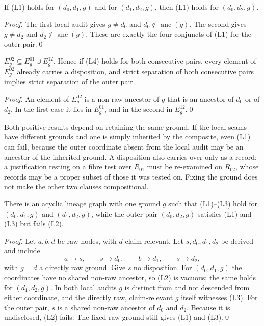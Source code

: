 \documentclass[smallextended,envcountsect,envcountsame,natbib]{svjour3}
\begin{document}
\begin{proposition}\label{ex:prop:l1-compose}
If (L1) holds for $(d_0,d_1,g)$ and for $(d_1,d_2,g)$, then (L1) holds for $(d_0,d_2,g)$.
\end{proposition}
\begin{proof}
The first local audit gives $g\neq d_0$ and $d_0\notin\operatorname{anc}(g)$. The second gives $g\neq d_2$ and $d_2\notin\operatorname{anc}(g)$. These are exactly the four conjuncts of (L1) for the outer pair.\qed
\end{proof}

\begin{proposition}\label{ex:prop:l4-compose}
$E^{02}_g\subseteq E^{01}_g\cup E^{12}_g$. Hence if (L4) holds for both consecutive pairs, every element of $E^{02}_g$ already carries a disposition, and strict separation of both consecutive pairs implies strict separation of the outer pair.
\end{proposition}
\begin{proof}
An element of $E^{02}_g$ is a non-raw ancestor of $g$ that is an ancestor of $d_0$ or of $d_2$. In the first case it lies in $E^{01}_g$, and in the second in $E^{12}_g$.\qed
\end{proof}

Both positive results depend on retaining the same ground. If the local seams have different grounds and one is simply inherited by the composite, even (L1) can fail, because the outer coordinate absent from the local audit may be an ancestor of the inherited ground. A disposition also carries over only as a record: a justification resting on a fibre test over $R_{01}$ must be re-examined on $R_{02}$, whose records may be a proper subset of those it was tested on. Fixing the ground does not make the other two clauses compositional.

\begin{proposition}\label{ex:prop:l2-noncompose}
There is an acyclic lineage graph with one ground $g$ such that (L1)--(L3) hold for $(d_0,d_1,g)$ and $(d_1,d_2,g)$, while the outer pair $(d_0,d_2,g)$ satisfies (L1) and (L3) but fails (L2).
\end{proposition}
\begin{proof}
Let $a,b,d$ be raw nodes, with $d$ claim-relevant. Let $s,d_0,d_1,d_2$ be derived and include
\[
a\to s,\qquad s\to d_0,\qquad b\to d_1,\qquad s\to d_2,
\]
with $g=d$ a directly raw ground. Give $s$ no disposition. For $(d_0,d_1,g)$ the coordinates have no shared non-raw ancestor, so (L2) is vacuous; the same holds for $(d_1,d_2,g)$. In both local audits $g$ is distinct from and not descended from either coordinate, and the directly raw, claim-relevant $g$ itself witnesses (L3). For the outer pair, $s$ is a shared non-raw ancestor of $d_0$ and $d_2$. Because it is undisclosed, (L2) fails. The fixed raw ground still gives (L1) and (L3).\qed
\end{proof}
\end{document}
